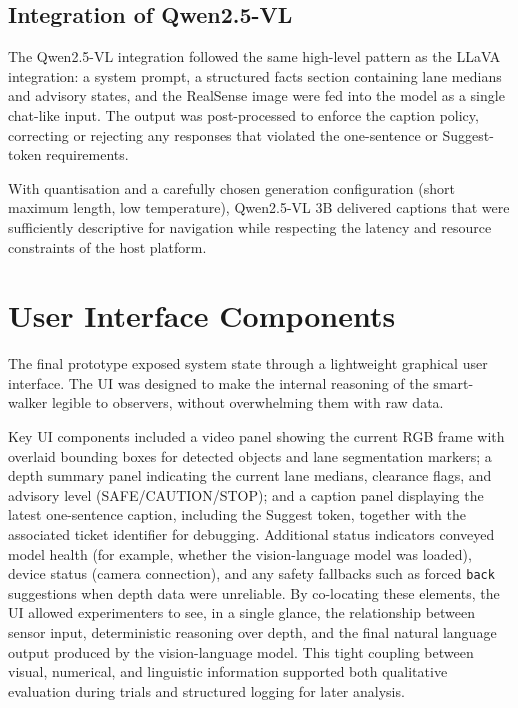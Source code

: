 \documentclass[11pt,a4paper]{article}
\newcommand{\code}[1]{\texttt{#1}}
\begin{document}
\subsection{Integration of Qwen2.5-VL}

The Qwen2.5-VL integration followed the same high-level pattern as the LLaVA integration: a system prompt, a structured facts section containing lane medians and advisory states, and the RealSense image were fed into the model as a single chat-like input. The output was post-processed to enforce the caption policy, correcting or rejecting any responses that violated the one-sentence or Suggest-token requirements.

With quantisation and a carefully chosen generation configuration (short maximum length, low temperature), Qwen2.5-VL 3B delivered captions that were sufficiently descriptive for navigation while respecting the latency and resource constraints of the host platform.

\section{User Interface Components}

The final prototype exposed system state through a lightweight graphical user interface. The UI was designed to make the internal reasoning of the smart-walker legible to observers, without overwhelming them with raw data.

Key UI components included a video panel showing the current RGB frame with overlaid bounding boxes for detected objects and lane segmentation markers; a depth summary panel indicating the current lane medians, clearance flags, and advisory level (SAFE/CAUTION/STOP); and a caption panel displaying the latest one-sentence caption, including the Suggest token, together with the associated ticket identifier for debugging. Additional status indicators conveyed model health (for example, whether the vision-language model was loaded), device status (camera connection), and any safety fallbacks such as forced \code{back} suggestions when depth data were unreliable. By co-locating these elements, the UI allowed experimenters to see, in a single glance, the relationship between sensor input, deterministic reasoning over depth, and the final natural language output produced by the vision-language model. This tight coupling between visual, numerical, and linguistic information supported both qualitative evaluation during trials and structured logging for later analysis.
\end{document}

